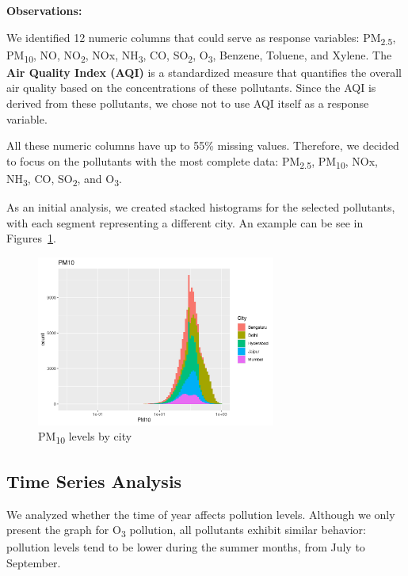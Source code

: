 \documentclass[12pt]{article}
\begin{document}
\textbf{Observations:}

We identified 12 numeric columns that could serve as response variables: PM\textsubscript{2.5}, PM\textsubscript{10}, NO, NO\textsubscript{2}, NOx, NH\textsubscript{3}, CO, SO\textsubscript{2}, O\textsubscript{3}, Benzene, Toluene, and Xylene. The \textbf{Air Quality Index (AQI)} is a standardized measure that quantifies the overall air quality based on the concentrations of these pollutants. Since the AQI is derived from these pollutants, we chose not to use AQI itself as a response variable.

All these numeric columns have up to 55\% missing values. Therefore, we decided to focus on the pollutants with the most complete data: PM\textsubscript{2.5}, PM\textsubscript{10}, NOx, NH\textsubscript{3}, CO, SO\textsubscript{2}, and O\textsubscript{3}.

As an initial analysis, we created stacked histograms for the selected pollutants, with each segment representing a different city.
An example can be see in Figures~\ref{fig:pm10_by_city}.

\begin{figure}[H]
    \centering
    \includegraphics[width=0.7\textwidth]{pm10-by-city.png}
    \caption{PM\textsubscript{10} levels by city}
    \label{fig:pm10_by_city}
\end{figure}


\subsection{Time Series Analysis}

We analyzed whether the time of year affects pollution levels. Although we only present the graph for O\textsubscript{3} pollution, all pollutants exhibit similar behavior: pollution levels tend to be lower during the summer months, from July to September.
\end{document}
